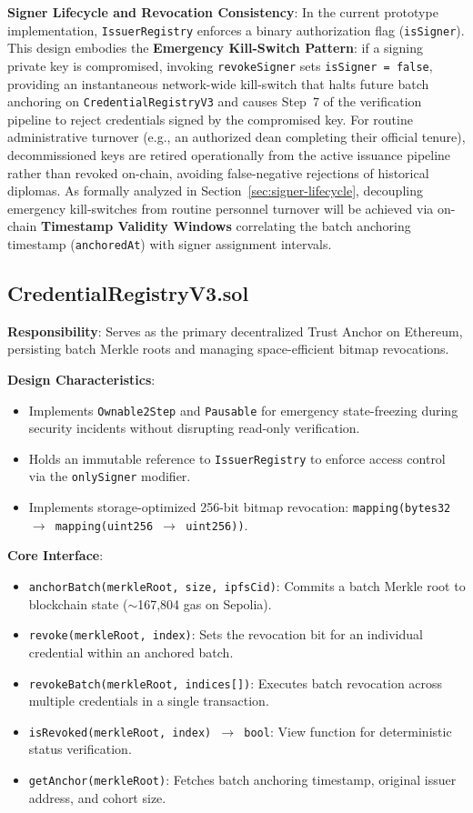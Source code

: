 \textbf{Signer Lifecycle and Revocation Consistency}:
In the current prototype implementation, \texttt{IssuerRegistry} enforces a binary authorization flag (\texttt{isSigner}). This design embodies the \textbf{Emergency Kill-Switch Pattern}: if a signing private key is compromised, invoking \texttt{revokeSigner} sets \texttt{isSigner = false}, providing an instantaneous network-wide kill-switch that halts future batch anchoring on \texttt{CredentialRegistryV3} and causes Step~7 of the verification pipeline to reject credentials signed by the compromised key. For routine administrative turnover (e.g., an authorized dean completing their official tenure), decommissioned keys are retired operationally from the active issuance pipeline rather than revoked on-chain, avoiding false-negative rejections of historical diplomas. As formally analyzed in Section~\ref{sec:signer-lifecycle}, decoupling emergency kill-switches from routine personnel turnover will be achieved via on-chain \textbf{Timestamp Validity Windows} correlating the batch anchoring timestamp (\texttt{anchoredAt}) with signer assignment intervals.

\subsection{CredentialRegistryV3.sol}

\textbf{Responsibility}: Serves as the primary decentralized Trust Anchor on Ethereum, persisting batch Merkle roots and managing space-efficient bitmap revocations.

\textbf{Design Characteristics}:
\begin{itemize}
    \item Implements \texttt{Ownable2Step} and \texttt{Pausable} for emergency state-freezing during security incidents without disrupting read-only verification.
    \item Holds an immutable reference to \texttt{IssuerRegistry} to enforce access control via the \texttt{onlySigner} modifier.
    \item Implements storage-optimized 256-bit bitmap revocation: \texttt{mapping(bytes32 $\rightarrow$ mapping(uint256 $\rightarrow$ uint256))}.
\end{itemize}

\textbf{Core Interface}:
\begin{itemize}
    \item \texttt{anchorBatch(merkleRoot, size, ipfsCid)}: Commits a batch Merkle root to blockchain state ($\sim$167,804 gas on Sepolia).
    \item \texttt{revoke(merkleRoot, index)}: Sets the revocation bit for an individual credential within an anchored batch.
    \item \texttt{revokeBatch(merkleRoot, indices[])}: Executes batch revocation across multiple credentials in a single transaction.
    \item \texttt{isRevoked(merkleRoot, index) $\rightarrow$ bool}: View function for deterministic status verification.
    \item \texttt{getAnchor(merkleRoot)}: Fetches batch anchoring timestamp, original issuer address, and cohort size.
\end{itemize}

